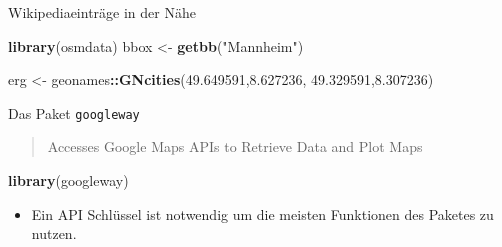 \documentclass[ignorenonframetext,]{beamer}
\newenvironment{Shaded}{\begin{snugshade}}{\end{snugshade}}
\newcommand{\KeywordTok}[1]{\textcolor[rgb]{0.13,0.29,0.53}{\textbf{#1}}}
\newcommand{\FloatTok}[1]{\textcolor[rgb]{0.00,0.00,0.81}{#1}}
\newcommand{\StringTok}[1]{\textcolor[rgb]{0.31,0.60,0.02}{#1}}
\newcommand{\OperatorTok}[1]{\textcolor[rgb]{0.81,0.36,0.00}{\textbf{#1}}}
\newcommand{\NormalTok}[1]{#1}
\providecommand{\tightlist}{%
  \setlength{\itemsep}{0pt}\setlength{\parskip}{0pt}}
\begin{document}
\begin{frame}[fragile]{Wikipediaeinträge in der Nähe}
\begin{Shaded}
\begin{Highlighting}[]
\KeywordTok{library}\NormalTok{(osmdata)}
\NormalTok{bbox <-}\StringTok{ }\KeywordTok{getbb}\NormalTok{(}\StringTok{"Mannheim"}\NormalTok{)}
\end{Highlighting}
\end{Shaded}

\begin{Shaded}
\begin{Highlighting}[]
\NormalTok{erg <-}\StringTok{ }\NormalTok{geonames}\OperatorTok{::}\KeywordTok{GNcities}\NormalTok{(}\FloatTok{49.649591}\NormalTok{,}\FloatTok{8.627236}\NormalTok{,}
                          \FloatTok{49.329591}\NormalTok{,}\FloatTok{8.307236}\NormalTok{)}
\end{Highlighting}
\end{Shaded}

\end{frame}

\begin{frame}[fragile]{Das Paket \texttt{googleway}}

\begin{quote}
Accesses Google Maps APIs to Retrieve Data and Plot Maps
\end{quote}

\begin{Shaded}
\begin{Highlighting}[]
\KeywordTok{library}\NormalTok{(googleway)}
\end{Highlighting}
\end{Shaded}

\begin{itemize}
\tightlist
\item
  Ein API Schlüssel ist notwendig um die meisten Funktionen des Paketes
  zu nutzen.
\end{itemize}

\end{frame}
\end{document}
